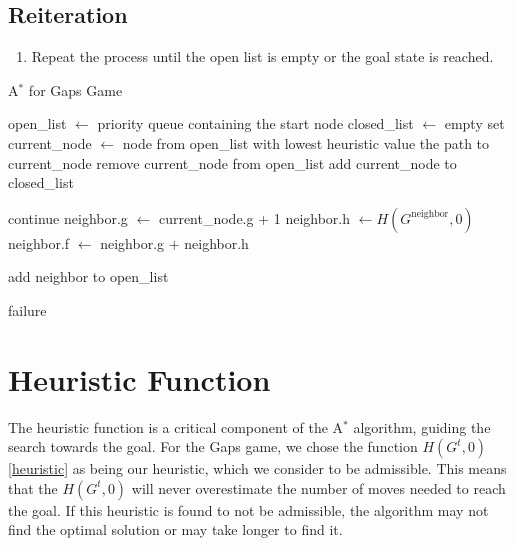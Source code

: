 \subsection{Reiteration}
\begin{enumerate}
    \item Repeat the process until the open list is empty or the goal state is reached.
\end{enumerate}

\begin{algorithm}[H]
    \caption{A$^*$ for Gaps Game}
    \begin{algorithmic}
    \State open\_list $\gets$ priority queue containing the start node
    \State closed\_list $\gets$ empty set
    \State current\_node $\gets$ node from open\_list with lowest heuristic value
        \State \Return the path to current\_node
    \EndIf
    \State remove current\_node from open\_list
    \State add current\_node to closed\_list

            \State continue
        \EndIf
        \State neighbor.g $\gets$ current\_node.g + 1 
        \State neighbor.h $\gets H(G^{\text{neighbor}}, 0)$ 
        \State neighbor.f $\gets$ neighbor.g + neighbor.h 

            \State add neighbor to open\_list
        \EndIf
    \EndFor
\EndWhile

\State \Return failure
\end{algorithmic}
\end{algorithm}

\section{Heuristic Function}
The heuristic function is a critical component of the A$^*$ algorithm, guiding the search towards the goal. For the Gaps game, we chose the function $H\left(G^t, 0\right)$ \ref{heuristic} as being our heuristic, which we consider to be admissible. This means that the $H\left(G^t, 0\right)$ will never overestimate the number of moves needed to reach the goal. If this heuristic is found to not be admissible, the algorithm may not find the optimal solution or may take longer to find it.

